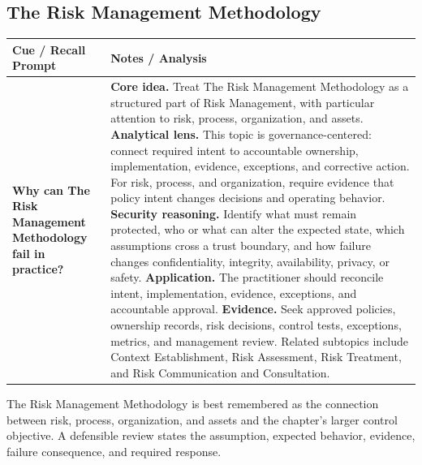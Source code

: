\documentclass[11pt]{article}
\newcommand{\CornellHeader}{%
\rowcolor{Navy}\color{white}\bfseries Cue / Recall Prompt & \color{white}\bfseries Notes / Analysis\\\hline}
\newcommand{\CornellRow}[2]{%
\cellcolor{CueGray}\RaggedRight\textbf{#1} & \RaggedRight #2\\\hline}
\begin{document}
\subsection*{The Risk Management Methodology}
\begin{longtable}{>{\RaggedRight\arraybackslash}p{}|>{\RaggedRight\arraybackslash}p{}}
\CornellHeader
\CornellRow{Why can The Risk Management Methodology fail in practice?}{\textbf{Core idea.} Treat The Risk Management Methodology as a structured part of Risk Management, with particular attention to risk, process, organization, and assets. \textbf{Analytical lens.} This topic is governance-centered: connect required intent to accountable ownership, implementation, evidence, exceptions, and corrective action. For risk, process, and organization, require evidence that policy intent changes decisions and operating behavior. \textbf{Security reasoning.} Identify what must remain protected, who or what can alter the expected state, which assumptions cross a trust boundary, and how failure changes confidentiality, integrity, availability, privacy, or safety. \textbf{Application.} The practitioner should reconcile intent, implementation, evidence, exceptions, and accountable approval. \textbf{Evidence.} Seek approved policies, ownership records, risk decisions, control tests, exceptions, metrics, and management review. Related subtopics include Context Establishment, Risk Assessment, Risk Treatment, and Risk Communication and Consultation.}
\end{longtable}
\begin{topicsummary}
The Risk Management Methodology is best remembered as the connection between risk, process, organization, and assets and the chapter's larger control objective. A defensible review states the assumption, expected behavior, evidence, failure consequence, and required response.
\end{topicsummary}
\end{document}
